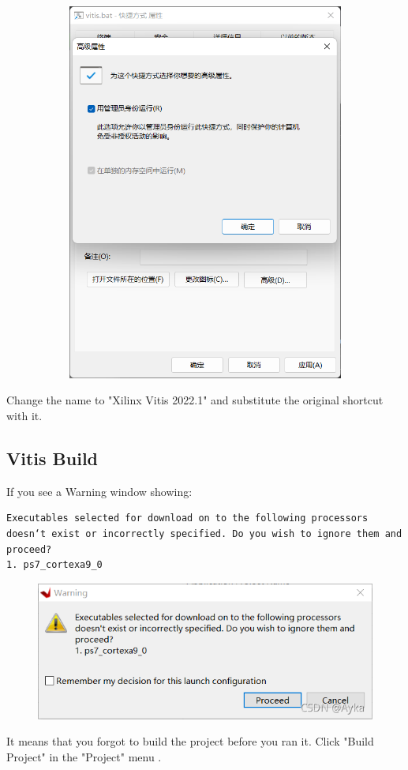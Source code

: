 \documentclass[a4paper,12pt,twoside]{article}
\begin{document}
\begin{figure}[H]
\begin{subfigure}[b]{0.45\textwidth}
         \includegraphics[width=\textwidth]{images/13.png}
     \end{subfigure}
\end{figure}
Change the name to "Xilinx Vitis 2022.1" and substitute the original shortcut with it.
\subsection{Vitis Build}\label{AA3}
If you see a Warning window showing:
\begin{verbatim}
Executables selected for download on to the following processors doesn‘t exist or incorrectly specified. Do you wish to ignore them and proceed?
1. ps7_cortexa9_0
\end{verbatim}
\begin{figure}[H]
    \centering
    \includegraphics[width=\textwidth]{images/16.png}
\end{figure}
It means that you forgot to build the project before you ran it. Click "Build Project" in the "Project" menu \cite{vitisbuild}.
\end{document}
